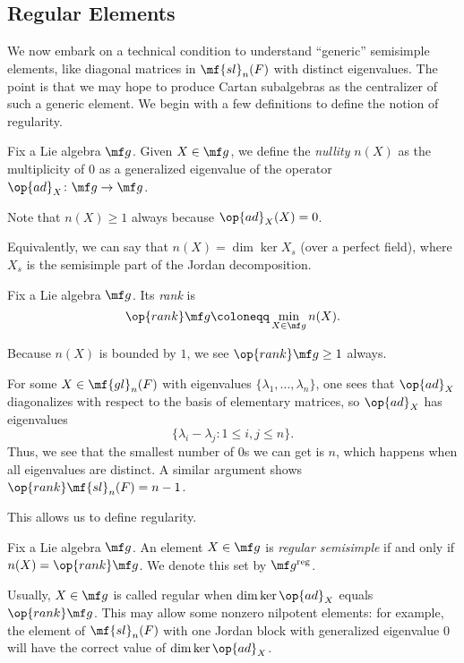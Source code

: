 \documentclass[../notes.tex]{subfiles}
\begin{document}
\subsection{Regular Elements}
We now embark on a technical condition to understand ``generic'' semisimple elements, like diagonal matrices in $\mf{sl}_n(F)$ with distinct eigenvalues. The point is that we may hope to produce Cartan subalgebras as the centralizer of such a generic element. We begin with a few definitions to define the notion of regularity.
\begin{definition}[nullity]
	Fix a Lie algebra $\mf g$. Given $X\in\mf g$, we define the \textit{nullity} $n(X)$ as the multiplicity of $0$ as a generalized eigenvalue of the operator $\op{ad}_X\colon\mf g\to\mf g$.
\end{definition}
\begin{remark}
	Note that $n(X)\ge1$ always because $\op{ad}_X(X)=0$.
\end{remark}
\begin{remark}
	Equivalently, we can say that $n(X)=\dim\ker X_s$ (over a perfect field), where $X_s$ is the semisimple part of the Jordan decomposition.
\end{remark}
\begin{definition}[rank]
	Fix a Lie algebra $\mf g$. Its \textit{rank} is
	\[\op{rank}\mf g\coloneqq\min_{X\in\mf g}n(X).\]
\end{definition}
\begin{remark}
	Because $n(X)$ is bounded by $1$, we see $\op{rank}\mf g\ge1$ always.
\end{remark}
\begin{example}
	For some $X\in\mf {gl}_n(F)$ with eigenvalues $\{\lambda_1,\ldots,\lambda_n\}$, one sees that $\op{ad}_X$ diagonalizes with respect to the basis of elementary matrices, so $\op{ad}_X$ has eigenvalues
	\[\{\lambda_i-\lambda_j:1\le i,j\le n\}.\]
	Thus, we see that the smallest number of $0$s we can get is $n$, which happens when all eigenvalues are distinct. A similar argument shows $\op{rank}\mf{sl}_n(F)=n-1$.
\end{example}
This allows us to define regularity.
\begin{definition}
	Fix a Lie algebra $\mf g$. An element $X\in\mf g$ is \textit{regular semisimple} if and only if $n(X)=\op{rank}\mf g$. We denote this set by $\mf g^{\mathrm{reg}}$.
\end{definition}
\begin{remark}
	Usually, $X\in\mf g$ is called regular when $\dim\ker\op{ad}_X$ equals $\op{rank}\mf g$. This may allow some nonzero nilpotent elements: for example, the element of $\mf{sl}_n(F)$ with one Jordan block with generalized eigenvalue $0$ will have the correct value of $\dim\ker\op{ad}_X$.
\end{remark}
\end{document}
